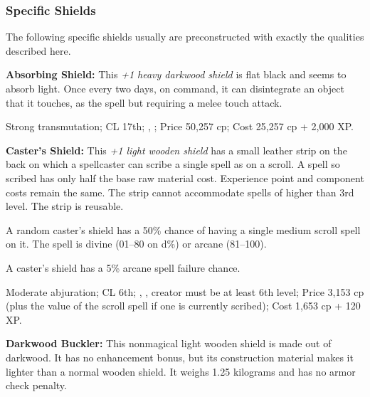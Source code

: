 
\subsubsection{Specific Shields}
The following specific shields usually are preconstructed with exactly the qualities described here.


\textbf{Absorbing Shield:} This \emph{+1 heavy darkwood shield} is flat black and seems to absorb light. Once every two days, on command, it can disintegrate an object that it touches, as the spell but requiring a melee touch attack.

Strong transmutation; CL 17th; , ; Price 50,257 cp; Cost 25,257 cp + 2,000 XP.


\textbf{Caster's Shield:} This \emph{+1 light wooden shield} has a small leather strip on the back on which a spellcaster can scribe a single spell as on a scroll. A spell so scribed has only half the base raw material cost. Experience point and component costs remain the same. The strip cannot accommodate spells of higher than 3rd level. The strip is reusable.

A random caster's shield has a 50\% chance of having a single medium scroll spell on it. The spell is divine (01--80 on d\%) or arcane (81--100).

A caster's shield has a 5\% arcane spell failure chance.

Moderate abjuration; CL 6th; , , creator must be at least 6th level; Price 3,153 cp (plus the value of the scroll spell if one is currently scribed); Cost 1,653 cp + 120 XP.


\textbf{Darkwood Buckler:} This nonmagical light wooden shield is made out of darkwood. It has no enhancement bonus, but its construction material makes it lighter than a normal wooden shield. It weighs 1.25 kilograms and has no armor check penalty.

